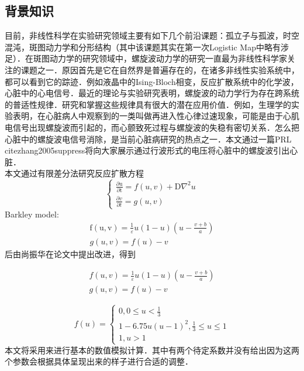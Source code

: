 

\subsection{背景知识}
目前，非线性科学在实验研究领域主要有如下几个前沿课题：孤立子与孤波，时空混沌，斑图动力学和分形结构（其中该课题其实在第一次Logistic Map中略有涉足）．在斑图动力学的研究领域中，螺旋波动力学的研究一直最为非线性科学家关注的课题之一．原因首先是它在自然界是普遍存在的，在诸多非线性实验系统中，都可以看到它的踪迹．例如液晶中的Ising-Bloch相变，反应扩散系统中的化学波，心脏中的心电信号．最近的理论与实验研究表明，螺旋波的动力学行为存在跨系统的普适性规律．研究和掌握这些规律具有很大的潜在应用价值．例如，生理学的实验表明，在心脏病人中观察到的一类叫做再进入性心律过速现象，可能是由于心肌电信号出现螺旋波而引起的，而心颤致死过程与螺旋波的失稳有密切关系．怎么把心脏中的螺旋波电信号消除，是当前心脏病研究的热点之一．本文通过一篇PRL cite{zhang2005suppress}将向大家展示通过行波形式的电压将心脏中的螺旋波引出心脏．\\
本文通过有限差分法研究反应扩散方程
\begin{equation}
\left\{\begin{array}{c}
\frac{\partial \mathrm{u}}{\partial \mathrm{t}}=f(u, v)+\mathrm{D} \nabla^{2} u \\
\frac{\partial v}{\partial t}=g(u, v)
\end{array}\right.
\end{equation}
Barkley model:
\begin{equation}
\begin{array}{c}
\mathrm{f}(\mathrm{u}, \mathrm{v})=\frac{1}{\varepsilon} u(1-u)\left(u-\frac{v+b}{a}\right) \\
g(u, v)=f(u)-v
\end{array}
\end{equation}
后由尚振华在论文中提出改进，得到

\begin{equation}

\begin{array}{c}
	f(u, v)=\frac{1}{\varepsilon} u(1-u)\left(u-\frac{v+b}{a}\right)\\
	g(u, v)=f(u)-v
\end{array}
\end{equation}

\begin{equation}

f(u)=\left\{\begin{array}{c}
0,0 \leq u<\frac{1}{3} \\
1-6.75 u(u-1)^{2}, \frac{1}{3} \leq u \leq 1 \\
1, u>1
\end{array}\right.
\end{equation}
本文将采用来进行基本的数值模拟计算．其中有两个待定系数并没有给出因为这两个参数会根据具体呈现出来的样子进行合适的调整．
